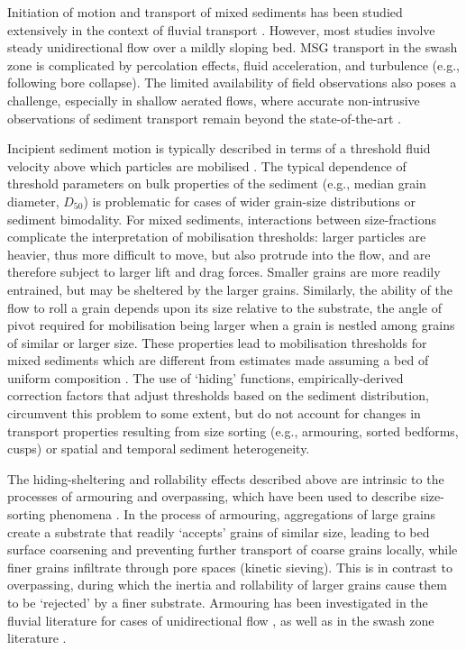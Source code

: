 Initiation of motion and transport of mixed sediments has been studied extensively in the context of fluvial transport \citep[e.g.,][]{Wilcock_McArdell1997, Wilcock_etal2001, Wilcock_Crowe2003, Buscombe_Conley2012}. However, most studies involve steady unidirectional flow over a mildly sloping bed. MSG transport in the swash zone is complicated by percolation effects, fluid acceleration, and turbulence (e.g., following bore collapse). The limited availability of field observations also poses a challenge, especially in shallow aerated flows, where accurate non-intrusive observations of sediment transport remain beyond the state-of-the-art \citep{PedrozoAcuna_etal2007}.

Incipient sediment motion is typically described in terms of a threshold fluid velocity above which particles are mobilised \citep[e.g., the Shields parameter,][]{Nielsen1992}. The typical dependence of threshold parameters on bulk properties of the sediment (e.g., median grain diameter, $D_{50}$) is problematic for cases of wider grain-size distributions or sediment bimodality. For mixed sediments, interactions between size-fractions complicate the interpretation of mobilisation thresholds: larger particles are heavier, thus more difficult to move, but also protrude into the flow, and are therefore subject to larger lift and drag forces. Smaller grains are more readily entrained, but may be sheltered by the larger grains. Similarly, the ability of the flow to roll a grain depends upon its size relative to the substrate, the angle of pivot required for mobilisation being larger when a grain is nestled among grains of similar or larger size. These properties lead to mobilisation thresholds for mixed sediments which are different from estimates made assuming a bed of uniform composition \citep{Wilcock_McArdell1993}. The use of `hiding' functions, empirically-derived correction factors that adjust thresholds based on the sediment distribution, circumvent this problem to some extent, but do not account for changes in transport properties resulting from size sorting (e.g., armouring, sorted bedforms, cusps) or spatial and temporal sediment heterogeneity. 

The hiding-sheltering and rollability effects described above are intrinsic to the processes of armouring and overpassing, which have been used to describe size-sorting phenomena \citep{Moss1962}. In the process of armouring, aggregations of large grains create a substrate that readily `accepts' grains of similar size, leading to bed surface coarsening and preventing further transport of coarse grains locally, while finer grains infiltrate through pore spaces (kinetic sieving). This is in contrast to overpassing, during which the inertia and rollability of larger grains cause them to be `rejected' by a finer substrate. Armouring has been investigated in the fluvial literature for cases of unidirectional flow \citep[e.g.,][]{Gomez1983}, as well as in the swash zone literature \citep[e.g.,][]{Isla1993}. 

